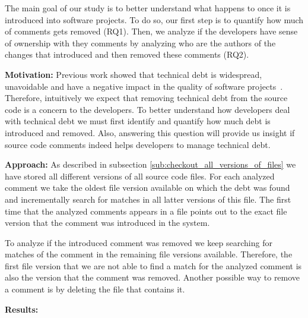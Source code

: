 The main goal of our study is to better understand what happens to \SATD once it is introduced into software projects. To do so, our first step is to quantify how much of \SATD comments gets removed (RQ1). Then, we analyze if the developers have sense of ownership with they \SATD comments by analyzing who are the authors of the changes that introduced and then removed these \SATD comments (RQ2). 

\vspace{3mm}
\noindent\rqi
\vspace{3mm}

\noindent \textbf{Motivation:} Previous work showed that technical debt is widespread, unavoidable and have a negative impact in the quality of software projects~\cite{Lim2012Software}. Therefore, intuitively we expect that removing technical debt from the source code is a concern to the developers. To better understand how developers deal with technical debt we must first identify and quantify how much debt is introduced and removed. Also, answering this question will provide us insight if source code comments indeed helps developers to manage technical debt. 

\vspace{1mm}
\noindent \textbf{Approach:} As described in subsection \ref{sub:checkout_all_versions_of_files} we have stored all different versions of all source code files. For each analyzed \SATD comment we take the oldest file version available on which the debt was found and incrementally search for matches in all latter versions of this file. The first time that the analyzed \SATD comments appears in a file points out to the exact file version that the \SATD comment was introduced in the system.

To analyze if the introduced \SATD comment was removed we keep searching for matches of the comment in the remaining file versions available. Therefore, the first file version that we are not able to find a match for the analyzed comment is also the version that the \SATD comment was removed. Another possible way to remove a \SATD comment is by deleting the file that contains it. 

\vspace{1mm}
\noindent \textbf{Results:} 




\vspace{3mm}
\noindent\rqii
\vspace{3mm}


